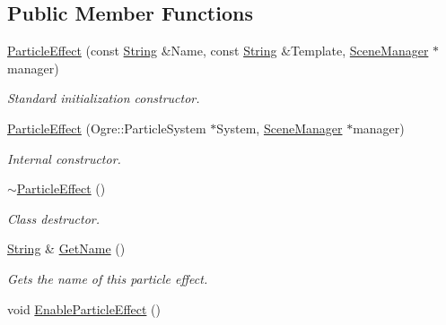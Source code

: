 \subsection*{Public Member Functions}
\begin{DoxyCompactItemize}
\item 
\hyperlink{classphys_1_1ParticleEffect_a42d17b7cd81968603c70920c30e6f812}{ParticleEffect} (const \hyperlink{namespacephys_aa03900411993de7fbfec4789bc1d392e}{String} \&Name, const \hyperlink{namespacephys_aa03900411993de7fbfec4789bc1d392e}{String} \&Template, \hyperlink{classphys_1_1SceneManager}{SceneManager} $\ast$manager)
\begin{DoxyCompactList}\small\item\em Standard initialization constructor. \item\end{DoxyCompactList}\item 
\hyperlink{classphys_1_1ParticleEffect_a112c7e4b2ec7c34c3aba3bd422ef8a1c}{ParticleEffect} (Ogre::ParticleSystem $\ast$System, \hyperlink{classphys_1_1SceneManager}{SceneManager} $\ast$manager)
\begin{DoxyCompactList}\small\item\em Internal constructor. \item\end{DoxyCompactList}\item 
\hypertarget{classphys_1_1ParticleEffect_a8c9c3d0cd1d02acdc626266ee485f51f}{
\hyperlink{classphys_1_1ParticleEffect_a8c9c3d0cd1d02acdc626266ee485f51f}{$\sim$ParticleEffect} ()}
\label{d2/d69/classphys_1_1ParticleEffect_a8c9c3d0cd1d02acdc626266ee485f51f}

\begin{DoxyCompactList}\small\item\em Class destructor. \item\end{DoxyCompactList}\item 
\hyperlink{namespacephys_aa03900411993de7fbfec4789bc1d392e}{String} \& \hyperlink{classphys_1_1ParticleEffect_a0e1a6f5fe489fc6e82c91df50fdab3c4}{GetName} ()
\begin{DoxyCompactList}\small\item\em Gets the name of this particle effect. \item\end{DoxyCompactList}\item 
\hypertarget{classphys_1_1ParticleEffect_aee95ac9b688885361d3066a5a4b83965}{
void \hyperlink{classphys_1_1ParticleEffect_aee95ac9b688885361d3066a5a4b83965}{EnableParticleEffect} ()}
\label{d2/d69/classphys_1_1ParticleEffect_aee95ac9b688885361d3066a5a4b83965}


\end{DoxyCompactItemize}
